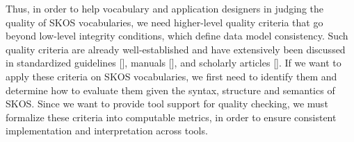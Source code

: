 Thus, in order to help vocabulary and application designers in judging the quality of SKOS vocabularies, we need higher-level quality criteria that go beyond low-level integrity conditions, which define data model consistency. Such quality criteria are already well-established and have extensively been discussed in standardized guidelines [], manuals [], and scholarly articles [].
If we want to apply these criteria on SKOS vocabularies, we first need to identify them and determine how to evaluate them given the syntax, structure and semantics of SKOS. Since we want to provide tool support for quality checking, we must formalize these criteria into computable metrics, in order to ensure consistent implementation and interpretation across tools.


% 
